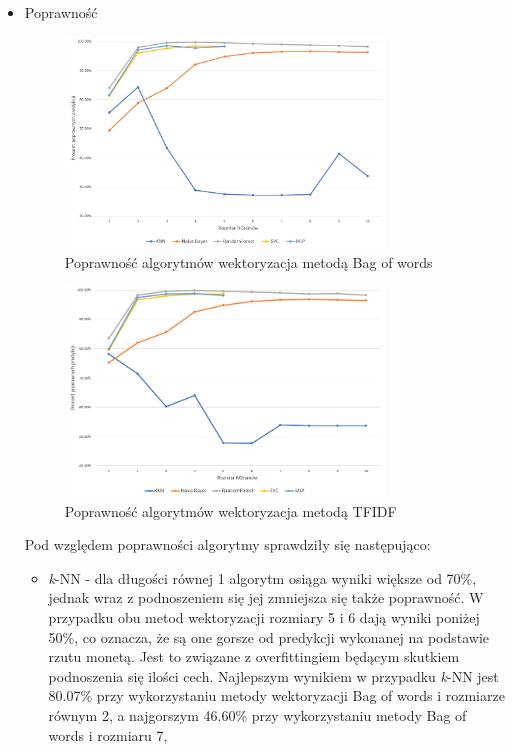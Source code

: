 \begin{itemize}
    \item Poprawność
    \begin{figure}[h!]
        \centering
        \includegraphics[width=0.8\textwidth]{./Img/BOWAcc.png}
        \caption{Poprawność algorytmów wektoryzacja metodą Bag of words}
    \end{figure}
    
    \begin{figure}[h!]
        \centering
        \includegraphics[width=0.8\textwidth]{./Img/TFIDFAcc.png}
        \caption{Poprawność algorytmów wektoryzacja metodą TFIDF}
    \end{figure}
    
    Pod względem poprawności algorytmy sprawdziły się następująco:
    \begin{itemize}
        \item \textit{k}-NN -
        dla długości równej 1 algorytm osiąga wyniki większe od 70\%, jednak wraz 
        z podnoszeniem się jej zmniejsza się także poprawność. W przypadku obu metod 
        wektoryzacji rozmiary 5 i 6 dają wyniki poniżej 50\%, co oznacza, że są one gorsze 
        od predykcji wykonanej na podstawie rzutu monetą. Jest to związane 
        z overfittingiem będącym skutkiem podnoszenia się ilości cech. Najlepszym wynikiem w 
        przypadku \textit{k}-NN jest 80.07\% przy wykorzystaniu metody wektoryzacji Bag of words i rozmiarze równym 2,
        a najgorszym 46.60\%  przy wykorzystaniu metody Bag of words i rozmiaru 7,


\end{itemize}
\end{itemize}
